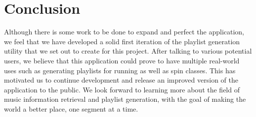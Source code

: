 \documentclass{article}
\begin{document}
\section{Conclusion}
Although there is some work to be done to expand and perfect the application, we feel that we have developed a solid first iteration of the playlist generation utility that we set out to create for this project. After talking to various potential users, we believe that this application could prove to have multiple real-world uses such as generating playlists for running as well as spin classes. This has motivated us to continue development and release an improved version of the application to the public. We look forward to learning more about the field of music information retrieval and playlist generation, with the goal of making the world a better place, one segment at a time.
\end{document}
